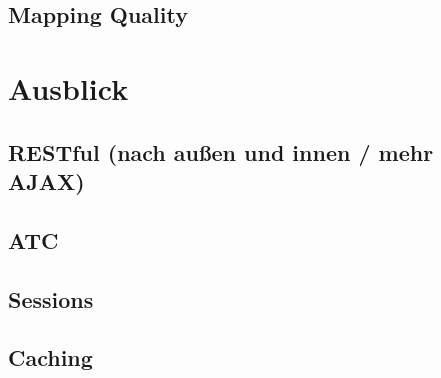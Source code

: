 \subsection{Mapping Quality}

\section{Ausblick}

\subsection{RESTful (nach außen und innen / mehr AJAX)}

\subsection{ATC}

\subsection{Sessions}

\subsection{Caching}

